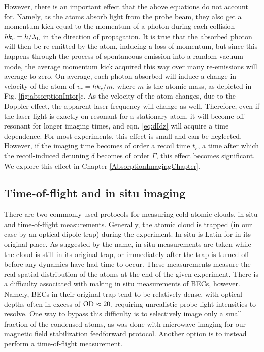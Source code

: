 However, there is an important effect that the above equations do not account for. Namely, as the atoms absorb light from the probe beam, they also get a momentum kick equal to the momentum of a photon during each collision $\hbar k_r=h/\lambda_{\rm L}$ in the direction of propagation. It is true that the absorbed photon will then be re-emitted by the atom, inducing a loss of momentum, but since this happens through the process of spontaneous emission into a random vacuum mode, the average momentum kick acquired this way over many re-emissions will average to zero. On average, each photon absorbed will induce a change in velocity of the atom of $v_r=\hbar k_r/m$, where $m$ is the atomic mass, as depicted in Fig. \ref{fig:absorptionIntor}c. As the velocity of the atom changes, due to the Doppler effect, the apparent laser frequency will change as well. Therefore, even if the laser light is exactly on-resonant for a stationary atom, it will become off-resonant for longer imaging times, and eqn. \ref{eq:dIdz} will acquire a time dependence. For most experiments, this effect is small and can be neglected. However, if the imaging time becomes of order a recoil time $t_r$, a time after which the recoil-induced detuning $\delta$ becomes of order $\Gamma$, this effect becomes significant. We explore this effect in Chapter \ref{AbsorptionImagingChapter}.  

\subsection{Time-of-flight and in situ imaging}\label{sec:timeOfFlight}
There are two commonly used protocols for measuring cold atomic clouds, in situ and time-of-flight measurements. Generally, the atomic cloud is trapped (in our case by an optical dipole trap) during the experiment. In situ is Latin for in its original place. As suggested by the name, in situ measurements are taken while the cloud is still in its original trap, or immediately after the trap is turned off before any dynamics have had time to occur. These measurements measure the real spatial distribution of the atoms at the end of the given experiment. There is a difficulty associated with making in situ measurements of BECs, however. Namely, BECs in their original trap tend to be relatively dense, with optical depths often in excess of ${\rm OD}\approx20$, requiring unrealistic probe light intensities to resolve. One way to bypass this difficulty is to selectively image only a small fraction of the condensed atoms, as was done with microwave imaging for our magnetic field stabilization feedforward protocol. Another option is to instead perform a time-of-flight measurement.

